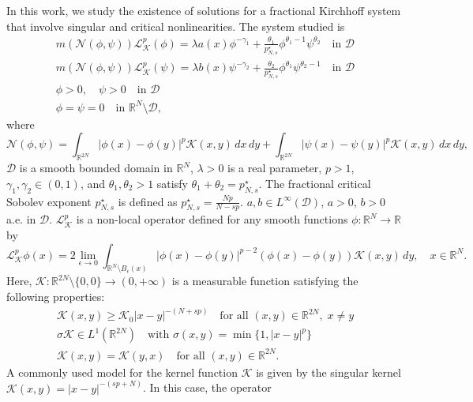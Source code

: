 \documentclass[10pt,a4paper]{amsart}
\numberwithin{equation}{section}
\begin{document}
In this work, we study the existence of solutions for a fractional Kirchhoff system 
that involve singular and critical nonlinearities. 
The system studied is
\begin{equation}\label{System}
\begin{gathered}
m(\mathcal{N}(\phi,\psi))\mathcal{L}_\mathcal{K}^p(\phi)
=\lambda a(x)\phi^{-\gamma_1}+\frac{\theta_1}{p^\star_{N,s}}\phi^{\theta_1-1}
\psi^{\theta_2} \quad \text{in } \mathcal{D} \\
m(\mathcal{N}(\phi,\psi))\mathcal{L}_\mathcal{K}^p(\psi)
=\lambda b(x)\psi^{-\gamma_2}+\frac{\theta_2}{p^\star_{N,s}}\phi^{\theta_1}
\psi^{\theta_2-1} \quad \text{in } \mathcal{D} \\
\phi>0,\quad \psi>0  \quad\text{in } \mathcal{D} \\
\phi=\psi=0 \quad \text{in } \mathbb{R}^N\setminus \mathcal{D},
\end{gathered}
\end{equation}
where
$$
\mathcal{N}(\phi,\psi)=\int_{\mathbb{R}^{2N}}|\phi(x)-\phi(y)|^p \mathcal{K}(x,y)\,dx\,dy
+\int_{\mathbb{R}^{2N}}|\psi(x)-\psi(y)|^p\mathcal{K}(x,y)\,dx\,dy,
$$
$\mathcal{D}$ is a smooth bounded domain in $\mathbb{R}^N$, $\lambda>0$ is a real 
parameter, $p>1$, $\gamma_1,\gamma_2\in (0,1)$, and $\theta_1,\theta_2>1$ satisfy 
$\theta_1+\theta_2=p^\star_{N,s}$. 
The fractional critical Sobolev exponent $p^\star_{N,s}$ is defined as 
$p^\star_{N,s}=\frac{Np}{N-sp}$. 
$a,b\in L^\infty(\mathcal{D})$, $a>0$, $b>0$ a.e. in $\mathcal{D}$. 
$\mathcal{L}_\mathcal{K}^p$ is a non-local operator defined for any smooth functions 
$\phi:\mathbb{R}^N\to\mathbb{R}$ by
$$
\mathcal{L}_\mathcal{K}^p\phi(x)
=2\lim_{\epsilon\to 0}\int_{\mathbb{R}^N\setminus B_\epsilon(x)}
|\phi(x)-\phi(y)|^{p-2}(\phi(x)-\phi(y))\mathcal{K}(x,y)\,dy,\quad x\in \mathbb{R}^N.
$$
Here, $\mathcal{K}:\mathbb{R}^{2N}\setminus \{0,0\}\to (0,+\infty)$ is a
 measurable function satisfying the following properties:
\begin{gather*}
\mathcal{K}(x,y)\geq \mathcal{K}_0|x-y|^{-(N+sp)}\quad
 \text{for all } (x,y)\in \mathbb{R}^{2N},\; x\neq y\\
\sigma\mathcal{K}\in L^1(\mathbb{R}^{2N})\quad \text{with }
 \sigma(x,y)=\min\{1,|x-y|^p\}\\
\mathcal{K}(x,y)=\mathcal{K}(y,x)\quad\text{for all } (x,y)\in \mathbb{R}^{2N}.
\end{gather*}
A commonly used model for the kernel function $\mathcal{K}$ is given by the singular 
kernel $\mathcal{K}(x,y)=|x-y|^{-(sp+N)}$. In this case, the operator 
\end{document}
